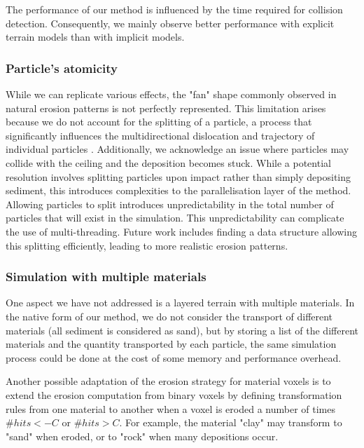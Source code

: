 The performance of our method is influenced by the time required for collision detection. Consequently, we mainly observe better performance with explicit terrain models than with implicit models.

\subsubsection{Particle's atomicity}
While we can replicate various effects, the "fan" shape commonly observed in natural erosion patterns is not perfectly represented. This limitation arises because we do not account for the splitting of a particle, a process that significantly influences the multidirectional dislocation and trajectory of individual particles \cite{Ranz1960}. Additionally, we acknowledge an issue where particles may collide with the ceiling and the deposition becomes stuck. While a potential resolution involves splitting particles upon impact rather than simply depositing sediment, this introduces complexities to the parallelisation layer of the method. Allowing particles to split introduces unpredictability in the total number of particles that will exist in the simulation. This unpredictability can complicate the use of multi-threading. Future work includes finding a data structure allowing this splitting efficiently, leading to more realistic erosion patterns.

\subsubsection{Simulation with multiple materials}
One aspect we have not addressed is a layered terrain with multiple materials. In the native form of our method, we do not consider the transport of different materials (all sediment is considered as sand), but by storing a list of the different materials and the quantity transported by each particle, the same simulation process could be done at the cost of some memory and performance overhead.

Another possible adaptation of the erosion strategy for material voxels is to extend the erosion computation from binary voxels by defining transformation rules from one material to another when a voxel is eroded a number of times $\#hits < -C$ or $\#hits > C$. For example, the material "clay" may transform to "sand" when eroded, or to "rock" when many depositions occur.

